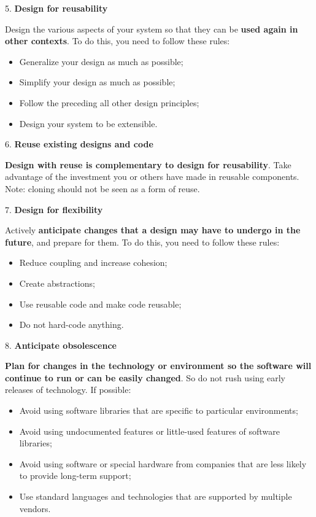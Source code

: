 \begin{flushleft}
    \large
    \textcolor{Red3}{5. \textbf{Design for reusability}}
\end{flushleft}
Design the various aspects of your system so that they can be \textbf{used again in other contexts}. To do this, you need to follow these rules:
\begin{itemize}
    \item Generalize your design as much as possible;
    \item Simplify your design as much as possible;
    \item Follow the preceding all other design principles;
    \item Design your system to be extensible.
\end{itemize}

\begin{flushleft}
    \large
    \textcolor{Red3}{6. \textbf{Reuse existing designs and code}}
\end{flushleft}
\textbf{Design with reuse is complementary to design for reusability}. Take advantage of the investment you or others have made in reusable components. Note: cloning should not be seen as a form of reuse.

\newpage

\begin{flushleft}
    \large
    \textcolor{Red3}{7. \textbf{Design for flexibility}}
\end{flushleft}
Actively \textbf{anticipate changes that a design may have to undergo in the future}, and prepare for them.  To do this, you need to follow these rules:
\begin{itemize}
    \item Reduce coupling and increase cohesion;
    \item Create abstractions;
    \item Use reusable code and make code reusable;
    \item Do not hard-code anything.
\end{itemize}

\begin{flushleft}
    \large
    \textcolor{Red3}{8. \textbf{Anticipate obsolescence}}
\end{flushleft}
\textbf{Plan for changes in the technology or environment so the software will continue to run or can be easily changed}. So do not rush using early releases of technology. If possible:
\begin{itemize}
    \item Avoid using software libraries that are specific to particular environments;
    \item Avoid using undocumented features or little-used features of software libraries;
    \item Avoid using software or special hardware from companies that are less likely to provide long-term support;
    \item Use standard languages and technologies that are supported by multiple vendors.
\end{itemize}

